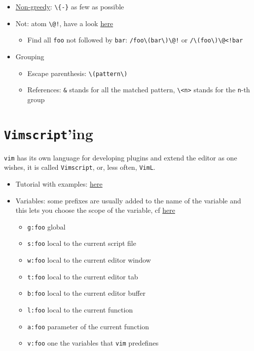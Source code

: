 \documentclass[a4paper,12pt,%
              final%
              ]{article}
\newcommand{\vim}{\texttt{vim}}
\newcommand{\vimscript}{\texttt{Vimscript}}
\begin{document}
\begin{itemize}
\begin{itemize}
      \item \href{http://vimregex.com/#Non-Greedy}{Non-greedy}: \verb|\{-}| as few as possible
      \item Not: atom \verb|\@!|, have a look \href{https://vim.fandom.com/wiki/Search_for_lines_not_containing_pattern_and_other_helpful_searches}{here}
        \begin{itemize}
          \item Find all \texttt{foo} not followed by \texttt{bar}: \verb|/foo\(bar\)\@!| or \verb|/\(foo\)\@<!bar|
        \end{itemize}
      \item Grouping
        \begin{itemize}
          \item Escape parenthesis: \verb|\(pattern\)|
          \item References: \verb|&| stands for all the matched pattern, \verb|\<n>| stands for the \texttt{n}-th group
        \end{itemize}
    \end{itemize}
\end{itemize}
%
\section{\vimscript{}'ing}
\vim{} has its own language for developing plugins and extend the editor as one wishes, it is called \vimscript{}, or, less often, \texttt{VimL}.
\begin{itemize}
  \item Tutorial with examples: \href{https://learnvimscriptthehardway.stevelosh.com/}{here}
  \item Variables: some prefixes are usually added to the name of the variable and this lets you choose the scope of the variable, cf \href{https://developer.ibm.com/articles/l-vim-script-1/#values-and-variables}{here}
    \begin{itemize}
      \item \texttt{g:foo} global
      \item \texttt{s:foo} local to the current script file
      \item \texttt{w:foo} local to the current editor window
      \item \texttt{t:foo} local to the current editor tab
      \item \texttt{b:foo} local to the current editor buffer
      \item \texttt{l:foo} local to the current function
      \item \texttt{a:foo} parameter of the current function
      \item \texttt{v:foo} one the variables that \vim{} predefines
    \end{itemize}
\end{itemize}
\end{document}

